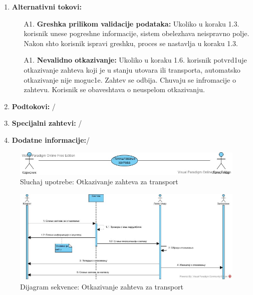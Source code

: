 \begin{enumerate}
\begin{enumerate}
        \end{enumerate}
    \item \textbf{Alternativni tokovi:}
            \begin{enumerate}
                \item [A1.] \textbf{Greshka prilikom validacije podataka: }
                Ukoliko u koraku 1.3. korisnik unese pogreshne informacije, sistem obelezhava neispravno polje. 
                Nakon shto korisnik ispravi greshku, proces se nastavlja u koraku 1.3.
                
                \item [A1.] \textbf{Nevalidno otkazivanje: }
                Ukoliko u koraku 1.6. korisnik potvrd1uje otkazivanje zahteva koji je u stanju utovara ili transporta, automatsko otkazivanje nije moguc1e. Zahtev se odbija. Chuvaju se infromacije o zahtevu. Korisnik se obaveshtava o neuspelom otkazivanju.
            \end{enumerate}
        
    \item \textbf{Podtokovi:} /
    \item \textbf{Specijalni zahtevi:} /
    \item \textbf{Dodatne informacije:}/
    
\end{enumerate}



\begin{figure}[h!]
    \includegraphics[scale=0.4]{Slike/UML/SUotkazivanjeZahteva.jpg}
    \centering
    \caption{Sluchaj upotrebe: Otkazivanje zahteva za transport}
    \label{fig:dsuponistavanje}
\end{figure}    

\begin{figure}[h!]
    \includegraphics[scale=0.4]{Slike/DFD/otkazivanje.jpg}
    \centering
    \caption{Dijagram sekvence: Otkazivanje zahteva za transport}
    \label{fig:otkazi}
\end{figure}    
\newpage
 



